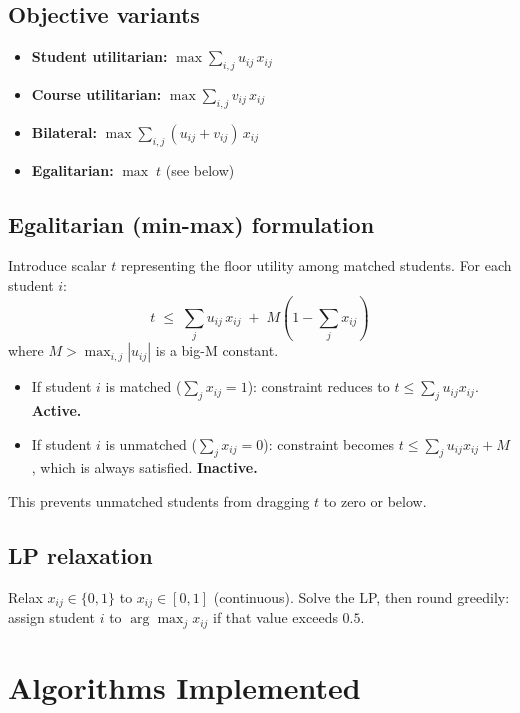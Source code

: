 \documentclass[11pt]{article}
\begin{document}
\subsection*{Objective variants}

\begin{itemize}
    \item \textbf{Student utilitarian:} $\displaystyle\max \sum_{i,j} u_{ij}\, x_{ij}$
    \item \textbf{Course utilitarian:} $\displaystyle\max \sum_{i,j} v_{ij}\, x_{ij}$
    \item \textbf{Bilateral:} $\displaystyle\max \sum_{i,j} (u_{ij} + v_{ij})\, x_{ij}$
    \item \textbf{Egalitarian:} $\displaystyle\max\; t$ \quad (see below)
\end{itemize}

\subsection*{Egalitarian (min-max) formulation}

Introduce scalar $t$ representing the floor utility among matched students.
For each student $i$:
\[
    t \;\leq\; \sum_j u_{ij}\, x_{ij} \;+\; M\!\left(1 - \sum_j x_{ij}\right)
\]
where $M > \max_{i,j}|u_{ij}|$ is a big-M constant.

\begin{itemize}
    \item If student $i$ is matched ($\sum_j x_{ij} = 1$): constraint reduces to $t \leq \sum_j u_{ij} x_{ij}$. \textbf{Active.}
    \item If student $i$ is unmatched ($\sum_j x_{ij} = 0$): constraint becomes $t \leq \sum_j u_{ij} x_{ij} + M$, which is always satisfied. \textbf{Inactive.}
\end{itemize}

This prevents unmatched students from dragging $t$ to zero or below.

\subsection*{LP relaxation}

Relax $x_{ij} \in \{0,1\}$ to $x_{ij} \in [0,1]$ (continuous). Solve the LP, then round greedily: assign student $i$ to $\arg\max_j x_{ij}$ if that value exceeds $0.5$.

\section{Algorithms Implemented}
\end{document}
